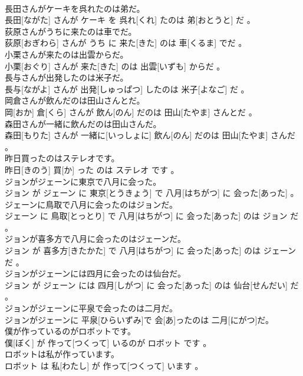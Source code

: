 \documentclass[8pt]{extreport}
\begin{document}
\begin{CJK}{UTF8}{min}
\\	長田さんがケーキを呉れたのは弟だ。	
\\	長田[ながた] さんが ケーキ を 呉れ[くれ] たのは 弟[おとうと] だ 。
\\	荻原さんがうちに来たのは車でだ。	
\\	荻原[おぎわら] さんが うち に 来た[きた] のは 車[くるま] でだ 。
\\	小栗さんが来たのは出雲からだ。	
\\	小栗[おぐり] さんが 来た[きた] のは 出雲[いずも] からだ 。
\\	長与さんが出発したのは米子だ。	
\\	長与[ながよ] さんが 出発[しゅっぱつ] したのは 米子[よなご] だ 。
\\	岡倉さんが飲んだのは田山さんとだ。	
\\	岡[おか] 倉[くら] さんが 飲ん[のん] だのは 田山[たやま] さんとだ 。
\\	森田さんが一緒に飲んだのは田山さんだ。	
\\	森田[もりた] さんが 一緒に[いっしょに] 飲ん[のん] だのは 田山[たやま] さんだ 。
\\	昨日買ったのはステレオです。	
\\	昨日[きのう] 買[か] った のは ステレオ です 。
\\	ジョンがジェーンに東京で八月に会った。	
\\	ジョン が ジェーン に 東京[とうきょう] で 八月[はちがつ] に 会った[あった] 。
\\	ジェーンに鳥取で八月に会ったのはジョンだ。	
\\	ジェーン に 鳥取[とっとり] で 八月[はちがつ] に 会った[あった] のは ジョン だ 。
\\	ジョンが喜多方で八月に会ったのはジェーンだ。	
\\	ジョン が 喜多方[きたかた] で 八月[はちがつ] に 会った[あった] のは ジェーン だ 。
\\	ジョンがジェーンには四月に会ったのは仙台だ。	
\\	ジョン が ジェーン には 四月[しがつ] に 会った[あった] のは 仙台[せんだい] だ 。
\\	ジョンがジェーンに平泉で会ったのは二月だ。	
\\	ジョンがジェーンに 平泉[ひらいずみ]で 会[あ]ったのは 二月[にがつ]だ。
\\	僕が作っているのがロボットです。	
\\	僕[ぼく] が 作って[つくって] いるのが ロボット です 。
\\	ロボットは私が作っています。	
\\	ロボット は 私[わたし] が 作って[つくって] います 。

\end{CJK}
\end{document}
